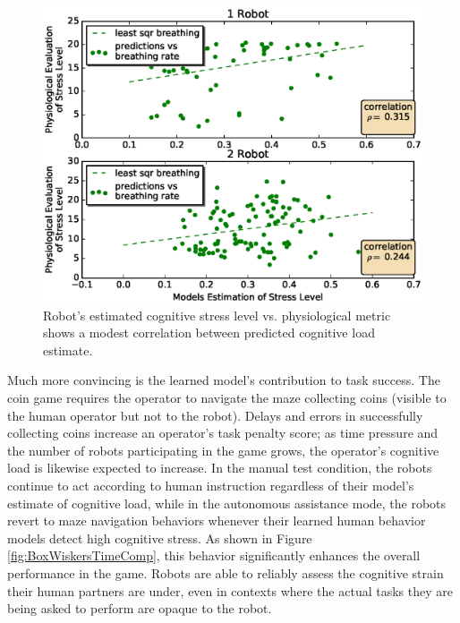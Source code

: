 \documentclass{sig-alternate}
\begin{document}

\begin{figure}  
\centering
\includegraphics[width=.5\textwidth]{prediction_vs_b_p_2.eps}
\caption{Robot's estimated cognitive stress level vs. physiological metric shows a modest correlation between predicted cognitive load estimate.}
\label{fig:pred_phy}
\end{figure}

Much more convincing is the learned model's contribution to task
success.  The coin game requires the operator to navigate the maze collecting coins (visible to the human operator but not to the robot).  Delays and errors in successfully collecting coins increase an operator's task penalty score; as time pressure and the number of robots participating in the game grows, the operator's cognitive load is likewise expected to increase.  In the manual test condition, the robots continue to act according to human instruction regardless of their model's estimate of cognitive load, while in the autonomous assistance mode, the robots revert to maze navigation behaviors whenever their learned human behavior models detect high cognitive stress.  As shown in Figure \ref{fig:BoxWiskersTimeComp}, this behavior significantly enhances the overall performance in the game.  Robots are able to reliably assess the cognitive strain their human partners are under, even in contexts where the actual tasks they are being asked to perform are opaque to the robot.
\end{document}
